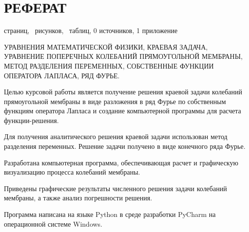 \section*{РЕФЕРАТ}{
	\begin{center}
	\pageref{LastPage} страниц,
	\totalfigures\ рисунков,
	\totaltables\ таблиц,
	0 источников,
	1 приложение
	\end{center}
	
    \begin{center}
       УРАВНЕНИЯ МАТЕМАТИЧЕСКОЙ ФИЗИКИ, КРАЕВАЯ  ЗАДАЧА, УРАВНЕНИЕ ПОПЕРЕЧНЫХ КОЛЕБАНИЙ  ПРЯМОУГОЛЬНОЙ МЕМБРАНЫ,
        МЕТОД РАЗДЕЛЕНИЯ ПЕРЕМЕННЫХ, СОБСТВЕННЫЕ ФУНКЦИИ ОПЕРАТОРА ЛАПЛАСА, РЯД 
        ФУРЬЕ.     
    \end{center}
    

Целью курсовой работы является получение решения краевой задачи колебаний прямоугольной мембраны в виде разложения в ряд Фурье по собственным функциям оператора Лапласа и создание компьютерной программы для расчета функции-решения.

Для  получения  аналитического  решения  краевой  задачи  использован 
метод разделения переменных. Решение задачи получено в виде конечного ряда Фурье.

Разработана  компьютерная  программа,  обеспечивающая  расчет  и 
графическую  визуализацию  процесса колебаний мембраны.

Приведены  графические  результаты  численного  решения  задачи колебаний мембраны, а также анализ погрешности решения.

Программа  написана  на  языке Python в  среде  разработки PyCharm на операционной системе Windows. 

}

\newpage
\tableofcontents
\newpage
{}
{}

